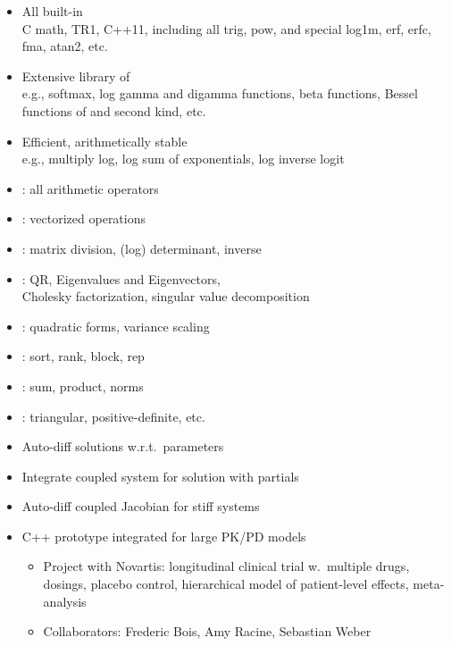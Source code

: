 \documentclass[10pt]{report}
\newcommand{\sld}[1]{\newpage{\noindent\LARGE \ \ \
    \textcolor{MidnightBlue}{\bfseries #1}}\vspace*{4pt}}
\newcommand{\myemph}[1]{{\color{MidnightBlue}{\bfseries #1}}}
\begin{document}
\sld{Built-in Math Functions}

\begin{itemize}
\item All built-in \myemph{C++ functions and operators}
  \\
  {\footnotesize C math, TR1, C++11, including all trig, pow, and
    special log1m, erf, erfc, fma, atan2, etc.}
\item Extensive library of \myemph{statistical functions}
  \\
  {\footnotesize e.g., softmax,
    log gamma and digamma functions, beta functions, Bessel functions of
    and second kind, etc.}
\item Efficient, arithmetically stable \myemph{compound functions}
  \\
  {\footnotesize e.g., multiply log, log sum of
    exponentials, log inverse logit}
\end{itemize}

\sld{Built-in Matrix Functions}

\begin{itemize}
\item \myemph{Basic arithmetic}: all arithmetic operators
\item \myemph{Elementwise arithmetic}: vectorized operations
\item \myemph{Solvers}: matrix division, (log) determinant,
  inverse 
\item \myemph{Decompositions}: QR, Eigenvalues and Eigenvectors, 
  \\
  Cholesky factorization, singular value decomposition
\item \myemph{Compound Operations}: quadratic forms, variance scaling
\item \myemph{Ordering, Slicing, Broadcasting}: sort, rank, block, rep
\item \myemph{Reductions}: sum, product, norms
\item \myemph{Specializations}: triangular, positive-definite, etc.
\end{itemize}

\sld{Differential Equation Solver}
\begin{itemize}
\item Auto-diff solutions w.r.t.\ parameters
\item Integrate coupled system for solution with partials
\item Auto-diff coupled Jacobian for stiff systems
  \vfill
\item C++ prototype integrated for large PK/PD models
  \vspace*{-4pt}
  \begin{itemize}\footnotesize
  \item 
    Project with Novartis: 
    longitudinal clinical trial w.\ multiple drugs, dosings, placebo control,
    hierarchical model of patient-level effects, meta-analysis
  \item
    Collaborators: Frederic Bois, Amy Racine, Sebastian Weber
  \end{itemize}
\end{itemize}
\end{document}
